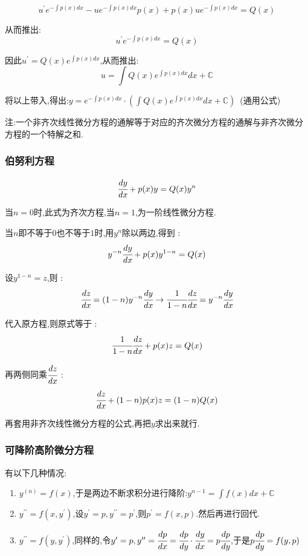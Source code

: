 \documentclass[UTF8,12pt]{ctexbook}
\newcommand{\derivative}{^\prime}
\newcommand{\doubleDerivative}{^{\prime\prime}}
\newcommand{\defFunction}[1]{f(#1)}
\newcommand{\mathConstant}{\mathbb{C}}
\begin{document}
{{{{\begin{enumerate}
{          $$
            u\derivative e^{-\int p(x)dx} - ue^{-\int p(x)dx}p(x) + p(x)ue^{-\int p(x)dx} = Q(x)
          $$

          从而推出:
          $$
            u\derivative e^{-\int p(x)dx} = Q(x)
          $$

          因此$u\derivative = Q(x)e^{\int p(x)dx}$,从而推出:
          $$
            u = \int Q(x)e^{\int p(x)dx}dx + \mathConstant
          $$

          将以上带入,得出:$y = e^{-\int p(x)dx}\cdot(\int Q(x)e^{\int p(x)dx}dx + \mathConstant)$\ (通用公式)
          }
  \end{enumerate}

  注:一个非齐次线性微分方程的通解等于对应的齐次微分方程的通解与非齐次微分方程的一个特解之和.

}%

\subsubsection{伯努利方程}{
  $$
    \cfrac{dy}{dx} + p(x)y = Q(x)y^n
  $$

  当$n = 0$时,此式为齐次方程,当$n = 1$,为一阶线性微分方程.

  当$n$即不等于$0$也不等于$1$时,用$y^n$除以两边,得到 :
  $$
    y^{-n}\cfrac{dy}{dx} + p(x)y^{1 - n} = Q(x)
  $$

  设$y^{1 - n} = z$,则 :
  $$
    \cfrac{dz}{dx} = (1 - n)y^{-n}\cfrac{dy}{dx} \to \cfrac{1}{1 - n}\cfrac{dz}{dx} = y^{-n}\cfrac{dy}{dx}
  $$

  代入原方程,则原式等于 :
  $$
    \cfrac{1}{1 - n}\cfrac{dz}{dx} + p(x)z = Q(x)
  $$

  再两侧同乘$\cfrac{dz}{dx}$ :
  $$
    \cfrac{dz}{dx} + (1 - n)p(x)z = (1 - n)Q(x)
  $$

  再套用非齐次线性微分方程的公式,再把$y$求出来就行.
}%

\subsubsection{可降阶高阶微分方程}{
  有以下几种情况:

  \begin{enumerate}
    \item $y^{(n)} = \defFunction{x}$,于是两边不断求积分进行降阶:$y^{n-1} = \int \defFunction{x}dx + \mathConstant$
    \item $y\doubleDerivative = \defFunction{x,y\derivative}$,设$y\derivative = p,y\doubleDerivative = p\derivative$,则$p\derivative = \defFunction{x,p}$.然后再进行回代.
    \item $y\doubleDerivative = \defFunction{y,y\derivative}$,同样的,令$y\derivative = p, y\doubleDerivative = \cfrac{dp}{dx} = \cfrac{dp}{dy}\cdot\cfrac{dy}{dx} = p\cfrac{dp}{dy}$,于是$p\cfrac{dp}{dy} = \defFunction{y,p}$
  \end{enumerate}

}}}}
\end{document}
